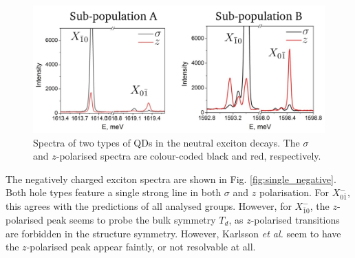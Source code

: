 \begin{figure}
\begin{center}
\includegraphics[width=\textwidth]{figures/single_neutral}
\end{center}
\caption{Spectra of two types of QDs in the neutral exciton decays. The $\sigma$ and $z$-polarised spectra are colour-coded black and red, respectively.\label{fig:single_neutral}}
\end{figure}

The negatively charged exciton spectra are shown in Fig. \ref{fig:single_negative}. Both hole types feature a single strong line in both $\sigma$ and $z$ polarisation. For $X^-_{0\bar{1}}$, this agrees with the predictions of all analysed groups. However, for $X^-_{\bar{1}0}$, the $z$-polarised peak seems to probe the bulk symmetry $T_d$, as $z$-polarised transitions are forbidden in the structure symmetry. However, Karlsson \textit{et al.} seem to have the $z$-polarised peak appear faintly, or not resolvable at all.
\\\hfill\\
\\\hfill\\

